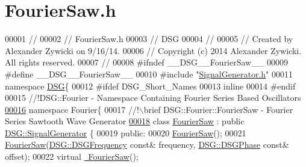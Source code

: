\hypertarget{_fourier_saw_8h_source}{\section{Fourier\+Saw.\+h}
\label{_fourier_saw_8h_source}
}

\begin{DoxyCode}
00001 \textcolor{comment}{//}
00002 \textcolor{comment}{//  FourierSaw.h}
00003 \textcolor{comment}{//  DSG}
00004 \textcolor{comment}{//}
00005 \textcolor{comment}{//  Created by Alexander Zywicki on 9/16/14.}
00006 \textcolor{comment}{//  Copyright (c) 2014 Alexander Zywicki. All rights reserved.}
00007 \textcolor{comment}{//}
00008 \textcolor{preprocessor}{#ifndef \_\_DSG\_\_FourierSaw\_\_}
00009 \textcolor{preprocessor}{#define \_\_DSG\_\_FourierSaw\_\_}
00010 \textcolor{preprocessor}{#include "\hyperlink{_signal_generator_8h}{SignalGenerator.h}"}
00011 \textcolor{keyword}{namespace }\hyperlink{namespace_d_s_g}{DSG}\{
00012 \textcolor{preprocessor}{#ifdef DSG\_Short\_Names}
00013     \textcolor{keyword}{inline}
00014 \textcolor{preprocessor}{#endif}
00015 \textcolor{comment}{    //!DSG::Fourier - Namespace Containing Fourier Series Based Oscillators}
\hypertarget{_fourier_saw_8h_source_l00016}{}\hyperlink{namespace_d_s_g_1_1_fourier}{00016} \textcolor{comment}{}    \textcolor{keyword}{namespace }Fourier\{\textcolor{comment}{}
00017 \textcolor{comment}{        //!\(\backslash\)brief DSG::Fourier::FourierSaw - Fourier Series Sawtooth Wave Generator}
\hypertarget{_fourier_saw_8h_source_l00018}{}\hyperlink{class_d_s_g_1_1_fourier_1_1_fourier_saw}{00018} \textcolor{comment}{}        \textcolor{keyword}{class }\hyperlink{class_d_s_g_1_1_fourier_1_1_fourier_saw}{FourierSaw} : \textcolor{keyword}{public} \hyperlink{class_d_s_g_1_1_signal_generator}{DSG::SignalGenerator} \{
00019         \textcolor{keyword}{public}:
00020             \hyperlink{class_d_s_g_1_1_fourier_1_1_fourier_saw_acfef03c4384ef656110c51102e346c49}{FourierSaw}();
00021             \hyperlink{class_d_s_g_1_1_fourier_1_1_fourier_saw_acfef03c4384ef656110c51102e346c49}{FourierSaw}(\hyperlink{namespace_d_s_g_a4315a061386fa1014fda09b15d3a6973}{DSG::DSGFrequency} \textcolor{keyword}{const}& frequency,
      \hyperlink{namespace_d_s_g_a44431ce1eb0a7300efdd207bc879e52c}{DSG::DSGPhase} \textcolor{keyword}{const}& offset);
00022             \textcolor{keyword}{virtual} \hyperlink{class_d_s_g_1_1_fourier_1_1_fourier_saw_acd28c4942553271ed9f39e8f05b8db6d}{~FourierSaw}();

\end{DoxyCode}
